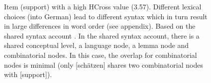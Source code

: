 \documentclass[output=paper]{LSP/langsci}
\begin{document}
\begin{figure}[t]
\caption{Item (support) with a high HCross value (3.57). Different lexical choices (into German) lead to different syntax which in turn result in large differences in word order (see appendix). Based on the shared syntax account \citep{Hartsuiker2004}. In the shared syntax account, there is a shared conceptual level, a language node, a lemma node and combinatorial nodes. In this case, the overlap for combinatorial nodes is minimal (only [schätzen] shares two combinatorial nodes with [support]).}
\label{schaeffer-carl:fig:9}
\end{figure}
\end{document}
